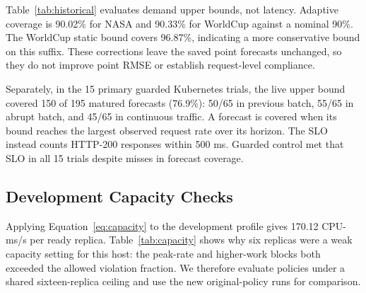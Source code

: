 \documentclass[10pt,twocolumn,a4paper]{article}
\begin{document}
Table~\ref{tab:historical} evaluates demand upper bounds, not latency. Adaptive coverage is 90.02\% for NASA and 90.33\% for WorldCup against a nominal 90\%. The WorldCup static bound covers 96.87\%, indicating a more conservative bound on this suffix. These corrections leave the saved point forecasts unchanged, so they do not improve point RMSE or establish request-level compliance.

Separately, in the 15 primary guarded Kubernetes trials, the live upper bound covered 150 of 195 matured forecasts (76.9\%): 50/65 in previous batch, 55/65 in abrupt batch, and 45/65 in continuous traffic. A forecast is covered when its bound reaches the largest observed request rate over its horizon. The SLO instead counts HTTP-200 responses within 500 ms. Guarded control met that SLO in all 15 trials despite misses in forecast coverage.
\subsection{Development Capacity Checks}

\begin{table}[t]\centering\small\setlength{\tabcolsep}{3pt}
\caption{Fixed-capacity development profile, one block per condition. Offered load lasts fifteen seconds at sixteen replicas and five seconds at the other sizes.}\label{tab:capacity}
\ifdim\wd\databox>\textwidth\relax\resizebox{\textwidth}{!}{\usebox{\databox}}\else\usebox{\databox}\fi
\end{table}

Applying Equation~\ref{eq:capacity} to the development profile gives 170.12 CPU-ms/s per ready replica. Table~\ref{tab:capacity} shows why six replicas were a weak capacity setting for this host: the peak-rate and higher-work blocks both exceeded the allowed violation fraction. We therefore evaluate policies under a shared sixteen-replica ceiling and use the new original-policy runs for comparison.
\end{document}
